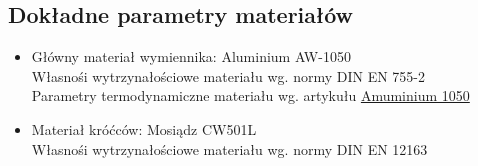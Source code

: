 \subsection{Dokładne parametry materiałów}
\begin{itemize}
    \item Główny materiał wymiennika: Aluminium AW-1050 \\
          Własnośi wytrzynałościowe materiału wg. normy DIN EN 755-2\\
          Parametry termodynamiczne materiału wg. artykułu \href{https://www.azom.com/article.aspx?ArticleID=2798}{Amuminium 1050}
    \item Materiał króćców: Mosiądz CW501L\\
          Własnośi wytrzynałościowe materiału wg. normy DIN EN 12163
\end{itemize}    